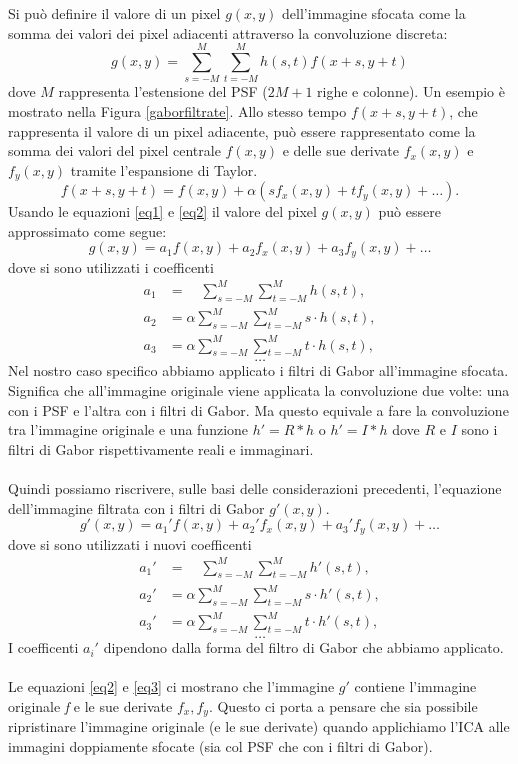 \documentclass[final]{siamltex}
\begin{document}
Si pu\`{o} definire il valore di un pixel $g(x,y)$ dell'immagine sfocata come la somma dei valori dei pixel adiacenti attraverso la convoluzione discreta:
%
\begin{equation}
\label{eq1}
g(x,y) =\sum_{s = -M}^M \sum_{t=-M}^M h(s,t)f(x+s,y+t)
\end{equation}
%
dove $M$ rappresenta l'estensione del PSF ($2M+1$ righe e colonne). Un esempio è mostrato nella Figura \ref{gaborfiltrate}. Allo stesso tempo $f(x+s,y+t)$, che rappresenta il valore di un pixel adiacente, pu\`{o} essere rappresentato come la somma dei valori del pixel centrale $f(x,y)$  e delle sue derivate $f_x(x,y)$ e $f_y(x,y)$ tramite l'espansione di Taylor.
%
\begin{equation}
\label{eq2}
f(x+s,y+t) = f(x,y) + \alpha(sf_x(x,y) + tf_y(x,y) + \dots ).
\end{equation}
%
Usando le equazioni \eqref{eq1} e \eqref{eq2} il valore del pixel $g(x,y)$ pu\`{o} essere approssimato come segue:
%
\begin{equation}
g(x,y) = a_1f(x,y)+a_2f_x(x,y)+a_3f_y(x,y)+ \dots
\end{equation}
%
dove si sono utilizzati i coefficenti 
%
\begin{align}
a_1 & = \quad\sum_{s = -M}^M \sum_{t=-M}^M h(s,t) ,       \\
a_2 & = \alpha\sum_{s = -M}^M \sum_{t=-M}^M s\cdot h(s,t), \\
a_3 & = \alpha\sum_{s = -M}^M \sum_{t=-M}^M t\cdot h(s,t),
\end{align}
$$\dots$$
%
Nel nostro caso specifico abbiamo applicato i filtri di Gabor all'immagine sfocata. Significa che all'immagine originale viene applicata la convoluzione due volte: una con i PSF e l'altra con i filtri di Gabor. Ma questo equivale a fare la convoluzione tra l'immagine originale e una funzione $h' = R*h$ o $h' = I * h$ dove $R$ e $I$ sono i filtri di Gabor rispettivamente reali e immaginari. \\
\\
Quindi possiamo riscrivere, sulle basi delle considerazioni precedenti, l'equazione dell'immagine filtrata con i filtri di Gabor $g'(x,y)$.
%
\begin{equation}
\label{eq3}
g'(x,y) = a_1'f(x,y)+a_2'f_x(x,y)+a_3'f_y(x,y)+ \dots
\end{equation}
%
dove si sono utilizzati i nuovi coefficenti
%
\begin{align}
a_1' &= \quad\sum_{s = -M}^M \sum_{t=-M}^M h'(s,t), \\
a_2' &= \alpha\sum_{s = -M}^M \sum_{t=-M}^M s\cdot h'(s,t), \\
a_3' &= \alpha\sum_{s = -M}^M \sum_{t=-M}^M t\cdot h'(s,t),
\end{align}
$$\dots$$
%
I coefficenti $a_i'$ dipendono dalla forma del filtro di Gabor che abbiamo applicato.
\\
\\
Le equazioni \eqref{eq2} e \eqref{eq3} ci mostrano che l'immagine $g'$ contiene l'immagine originale \textit{f} e le sue derivate $f_x, f_y$. Questo ci porta a pensare che sia possibile ripristinare l'immagine originale (e le sue derivate) quando applichiamo l'ICA alle immagini doppiamente sfocate (sia col PSF che con i filtri di Gabor).
%
%
\end{document}
